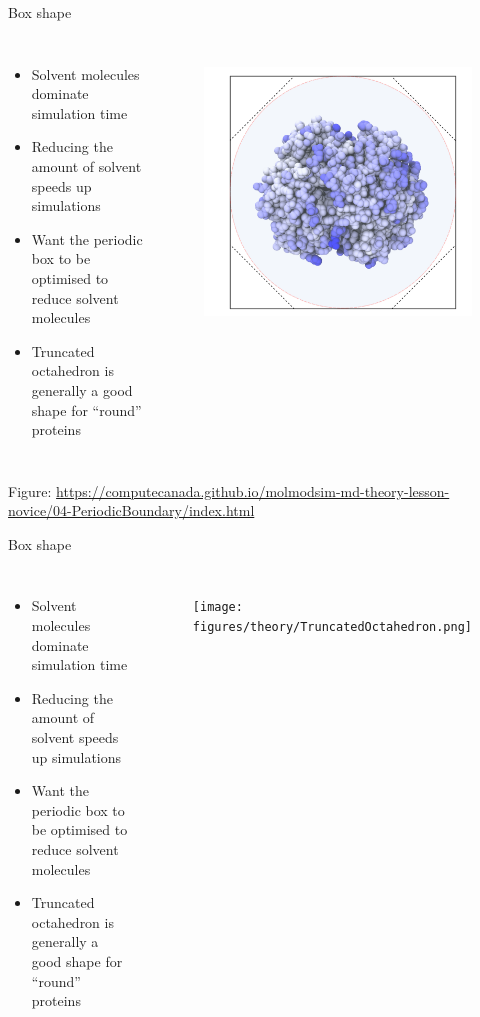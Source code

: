 \begin{frame}{Box shape}
\begin{columns}
\begin{itemize}
	\item Solvent molecules dominate simulation time
	\item Reducing the amount of solvent speeds up simulations
	\item Want the periodic box to be optimised to reduce solvent molecules
	\item Truncated octahedron is generally a good shape for \enquote{round} proteins
\end{itemize}
\begin{figure}
\includegraphics[height=0.7\textwidth]{figures/theory/cubic_box.png}
\end{figure}
\end{columns}
{\tiny Figure: \href{https://computecanada.github.io/molmodsim-md-theory-lesson-novice/04-Periodic_Boundary/index.html}{https://computecanada.github.io/molmodsim-md-theory-lesson-novice/04-Periodic\textunderscore Boundary/index.html}}
\end{frame}
\begin{frame}{Box shape}
\begin{columns}
\begin{itemize}
	\item Solvent molecules dominate simulation time
	\item Reducing the amount of solvent speeds up simulations
	\item Want the periodic box to be optimised to reduce solvent molecules
	\item Truncated octahedron is generally a good shape for \enquote{round} proteins
\end{itemize}
\begin{figure}
\texttt{[image: figures/theory/TruncatedOctahedron.png]}
\end{figure}
\end{columns}

\end{frame}

